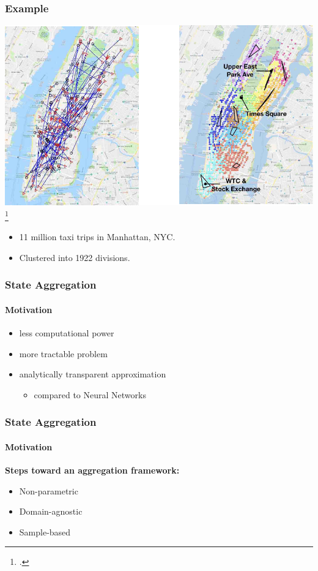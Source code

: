 \documentclass[mathserif]{beamer}
\begin{document}
    \begin{frame}
        \frametitle{Example}

        \center \includegraphics[scale=0.9]{res/manhattan-taxi.png}\let\thefootnote\relax\footcite{Duan2019}


        \begin{itemize}
            \item 11 million taxi trips in Manhattan, NYC.
            \item Clustered into 1922 divisions.
        \end{itemize}

    \end{frame}


    \begin{frame}
        \frametitle{State Aggregation}
        \framesubtitle{Motivation}

        \begin{itemize}
            \item less computational power
            \item more tractable problem
            \item analytically transparent approximation
            \begin{itemize}
                \item compared to Neural Networks
            \end{itemize}
        \end{itemize}
    \end{frame}


    \begin{frame}
        \frametitle{State Aggregation}
        \framesubtitle{Motivation}

        {\Large \textbf{Steps toward an aggregation framework:}}

        \begin{itemize}
            \item Non-parametric
            \item Domain-agnostic
            \item Sample-based
        \end{itemize}


    \end{frame}
\end{document}
